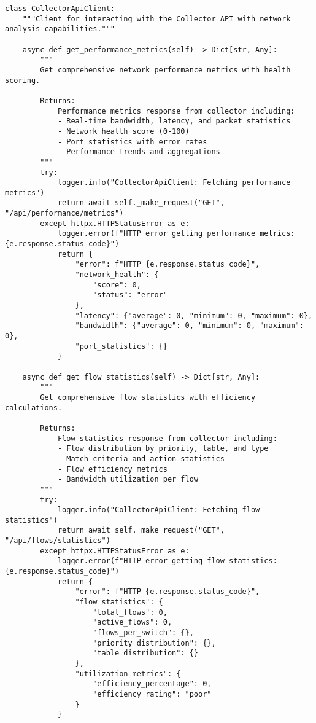 \begin{lstlisting}[style=pythoncode, caption=Network Performance Analysis]
class CollectorApiClient:
    """Client for interacting with the Collector API with network analysis capabilities."""

    async def get_performance_metrics(self) -> Dict[str, Any]:
        """
        Get comprehensive network performance metrics with health scoring.
        
        Returns:
            Performance metrics response from collector including:
            - Real-time bandwidth, latency, and packet statistics  
            - Network health score (0-100)
            - Port statistics with error rates
            - Performance trends and aggregations
        """
        try:
            logger.info("CollectorApiClient: Fetching performance metrics")
            return await self._make_request("GET", "/api/performance/metrics")
        except httpx.HTTPStatusError as e:
            logger.error(f"HTTP error getting performance metrics: {e.response.status_code}")
            return {
                "error": f"HTTP {e.response.status_code}",
                "network_health": {
                    "score": 0,
                    "status": "error"
                },
                "latency": {"average": 0, "minimum": 0, "maximum": 0},
                "bandwidth": {"average": 0, "minimum": 0, "maximum": 0},
                "port_statistics": {}
            }

    async def get_flow_statistics(self) -> Dict[str, Any]:
        """
        Get comprehensive flow statistics with efficiency calculations.
        
        Returns:
            Flow statistics response from collector including:
            - Flow distribution by priority, table, and type
            - Match criteria and action statistics  
            - Flow efficiency metrics
            - Bandwidth utilization per flow
        """
        try:
            logger.info("CollectorApiClient: Fetching flow statistics")
            return await self._make_request("GET", "/api/flows/statistics")
        except httpx.HTTPStatusError as e:
            logger.error(f"HTTP error getting flow statistics: {e.response.status_code}")
            return {
                "error": f"HTTP {e.response.status_code}",
                "flow_statistics": {
                    "total_flows": 0,
                    "active_flows": 0,
                    "flows_per_switch": {},
                    "priority_distribution": {},
                    "table_distribution": {}
                },
                "utilization_metrics": {
                    "efficiency_percentage": 0,
                    "efficiency_rating": "poor"
                }
            }


\end{lstlisting}
